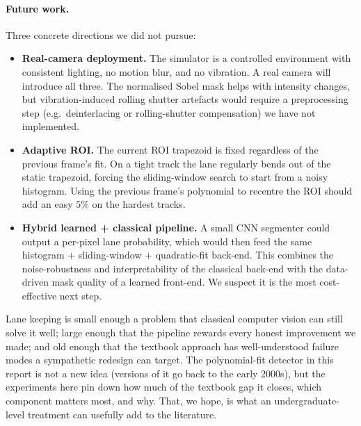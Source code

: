 \paragraph{Future work.}
Three concrete directions we did not pursue:
\begin{itemize}[leftmargin=1.4em,itemsep=2pt]
  \item \textbf{Real-camera deployment.} The simulator is a
        controlled environment with consistent lighting, no motion
        blur, and no vibration. A real camera will introduce all
        three. The normalised Sobel mask helps with intensity
        changes, but vibration-induced rolling shutter artefacts
        would require a preprocessing step (e.g.\ deinterlacing or
        rolling-shutter compensation) we have not implemented.
  \item \textbf{Adaptive ROI.} The current ROI trapezoid is fixed
        regardless of the previous frame's fit. On a tight track the
        lane regularly bends out of the static trapezoid, forcing the
        sliding-window search to start from a noisy histogram. Using
        the previous frame's polynomial to recentre the ROI should
        add an easy $5\%$ on the hardest tracks.
  \item \textbf{Hybrid learned + classical pipeline.} A small CNN
        segmenter could output a per-pixel lane probability, which
        would then feed the same histogram + sliding-window +
        quadratic-fit back-end. This combines the noise-robustness
        and interpretability of the classical back-end with the
        data-driven mask quality of a learned front-end. We suspect
        it is the most cost-effective next step.
\end{itemize}

Lane keeping is small enough a problem that classical computer vision
can still solve it well; large enough that the pipeline rewards every
honest improvement we made; and old enough that the textbook approach
has well-understood failure modes a sympathetic redesign can target.
The polynomial-fit detector in this report is not a new idea (versions
of it go back to the early 2000s), but the experiments here pin down
how much of the textbook gap it closes, which component matters most,
and why. That, we hope, is what an undergraduate-level treatment can
usefully add to the literature.
